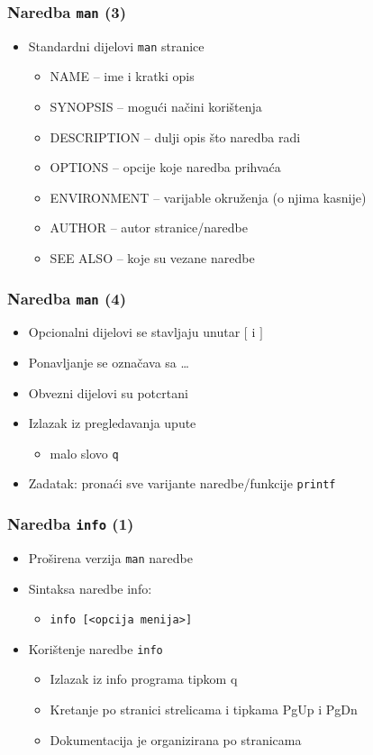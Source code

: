 \documentclass{beamer}
\newcommand{\shell}[1]{\texttt{#1}}
\begin{document}
\begin{frame}[t]
\frametitle{Naredba \shell{man} (3)}
\begin{itemize}
  \item Standardni dijelovi \shell{man} stranice
  \begin{itemize}
    \item NAME -- ime i kratki opis
    \item SYNOPSIS -- mogući načini korištenja
    \item DESCRIPTION -- dulji opis što naredba radi
    \item OPTIONS -- opcije koje naredba prihvaća
    \item ENVIRONMENT -- varijable okruženja (o njima kasnije)
    \item AUTHOR -- autor stranice/naredbe
    \item SEE ALSO -- koje su vezane naredbe
  \end{itemize}
\end{itemize}
\end{frame}

\begin{frame}[t]
\frametitle{Naredba \shell{man} (4)}
\begin{itemize}
  \item Opcionalni dijelovi se stavljaju unutar $[$ i $]$
  \item Ponavljanje se označava sa \ldots
  \item Obvezni dijelovi su potcrtani
  \item Izlazak iz pregledavanja upute
  \begin{itemize}
    \item malo slovo \shell{q}
  \end{itemize}
  \item Zadatak: pronaći sve varijante naredbe/funkcije \shell{printf}
\end{itemize}
\end{frame}

\begin{frame}[t]
\frametitle{Naredba \shell{info} (1)}
\begin{itemize}
  \item Proširena verzija \shell{man} naredbe
  \item Sintaksa naredbe info:
  \begin{itemize}
    \item \shell{info [<opcija menija>]}
  \end{itemize}
  \item Korištenje naredbe \shell{info}
  \begin{itemize}
    \item Izlazak iz info programa tipkom q
    \item Kretanje po stranici strelicama i tipkama PgUp i PgDn
    \item Dokumentacija je organizirana po stranicama
  \end{itemize}
\end{itemize}
\end{frame}
\end{document}
